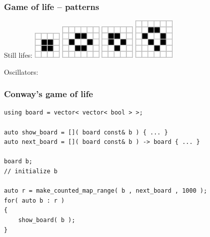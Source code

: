 \documentclass{beamer}
\newcommand{\heading}[1]{\frametitle{#1}}
\begin{document}
\begin{frame}[fragile]
 \heading{Game of life -- patterns}
 
 Still lifes:
\hspace{2ex}
\includegraphics[draft=false,width=0.1\textwidth]
{66px-Game_of_life_block_with_border.png}
\hspace{2ex}
\includegraphics[draft=false,width=0.148485\textwidth]
{98px-Game_of_life_beehive.png}
\hspace{2ex}
\includegraphics[draft=false,width=0.12424\textwidth]
{82px-Game_of_life_boat.png}
\hspace{2ex}
\includegraphics[draft=false,width=0.148485\textwidth]
{98px-Game_of_life_loaf.png}

Oscillators:
\hspace{2ex}


\end{frame}


\begin{frame}[fragile]
 \heading{Conway's game of life}
 
 \begin{lstlisting}[basicstyle=\scriptsize\ttfamily]
using board = vector< vector< bool > >;

auto show_board = []( board const& b ) { ... }
auto next_board = []( board const& b ) -> board { ... }

board b;
// initialize b

auto r = make_counted_map_range( b , next_board , 1000 );
for( auto b : r )
{
    show_board( b );
}
 \end{lstlisting}

\end{frame}
\end{document}
